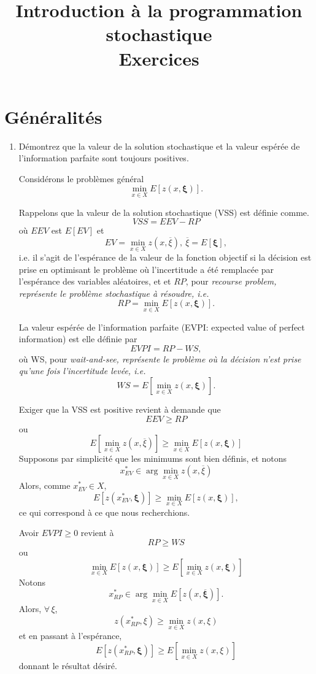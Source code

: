 \documentclass[12pt]{book}
\title{	Introduction à la programmation stochastique\\
	Exercices}
\def\bxi {\boldsymbol{\xi}}
\begin{document}
\maketitle

\chapter{Généralités}

\begin{enumerate}
\item
Démontrez que la valeur de la solution stochastique et la valeur espérée de l'information parfaite sont toujours positives.

Considérons le problèmes général
$$
\min_{x \in X} E[z(x,\bxi)].
$$

Rappelons que la valeur de la solution stochastique (VSS) est définie comme.
$$
VSS = EEV - RP
$$
où $EEV$ est $E[EV]$ et
$$
EV = \min_{x \in X} z(x, \overline{\xi}),\ \overline{\xi} = E[\bxi],
$$
i.e. il s'agit de l'espérance de la valeur de la fonction objectif si la décision est prise en optimisant le problème où l'incertitude a été remplacée par l'espérance des variables aléatoires, et
et $RP$, pour \em{recourse problem}, représente le problème stochastique à résoudre, i.e.
$$
RP = \min_{x \in X} E[z(x, \bxi)].
$$

La valeur espérée de l'information parfaite (EVPI: expected value of perfect information) est elle définie par
$$
EVPI = RP - WS,
$$
où WS, pour \em{wait-and-see}, représente le problème où la décision n'est prise qu'une fois l'incertitude levée, i.e.
$$
WS = E \left[ \min_{x \in X} z(x, \bxi) \right].
$$

Exiger que la VSS est positive revient à demande que
$$
EEV \geq RP
$$
ou
$$
E[ \min_{x \in X} z(x, \overline{\xi}) ] \geq  \min_{x \in X} E[z(x, \bxi)]
$$
Supposons par simplicité que les minimums sont bien définis, et notons
$$
x^*_{EV} \in \arg \min_{x \in X} z(x,\overline{\xi})
$$
Alors, comme $x^*_{EV} \in X$,
$$
E[z(x^*_{EV}, \bxi)] \geq \min_{x \in X} E[z(x, \bxi)],
$$
ce qui correspond à ce que nous recherchions.

Avoir $EVPI \geq 0$ revient à
$$
RP \geq WS
$$
ou
$$
\min_{x \in X} E[z(x, \bxi)] \geq E  \left[ \min_{x \in X} z(x, \bxi) \right]
$$
Notons
$$
x^*_{RP} \in \arg \min_{x \in X} E [z(x,\overline{\bxi})].
$$
Alors, $\forall\, \xi$,
$$
z(x^*_{RP}, \xi) \geq \min_{x \in X} z(x, \xi)
$$
et en passant à l'espérance,
$$
E[z(x^*_{RP}, \bxi)] \geq E \left[ \min_{x \in X} z(x, \xi) \right]
$$
donnant le résultat désiré.

\end{enumerate}
\end{document}
